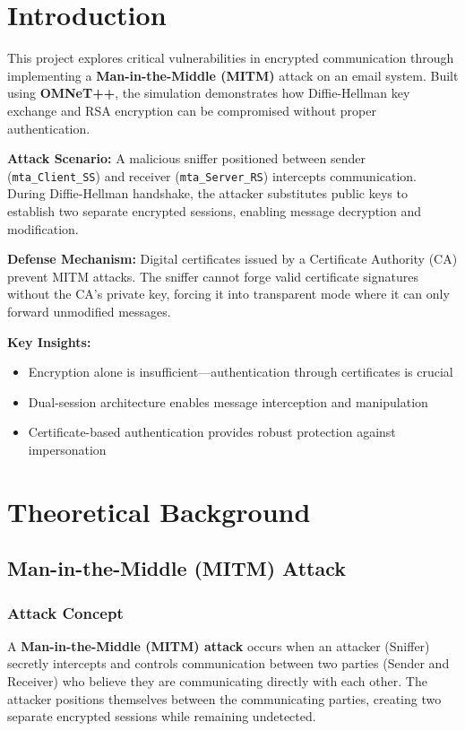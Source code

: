 \documentclass[a4paper,12pt]{extarticle}
\newcommand{\code}[1]{\texttt{\colorbox{codebackground}{#1}}}
\begin{document}
\section{Introduction}

This project explores critical vulnerabilities in encrypted communication through implementing a \textbf{Man-in-the-Middle (MITM)} attack on an email system. Built using \textbf{OMNeT++}, the simulation demonstrates how Diffie-Hellman key exchange and RSA encryption can be compromised without proper authentication.

\textbf{Attack Scenario:} A malicious sniffer positioned between sender (\code{mta\_Client\_SS}) and receiver (\code{mta\_Server\_RS}) intercepts communication. During Diffie-Hellman handshake, the attacker substitutes public keys to establish two separate encrypted sessions, enabling message decryption and modification.

\textbf{Defense Mechanism:} Digital certificates issued by a Certificate Authority (CA) prevent MITM attacks. The sniffer cannot forge valid certificate signatures without the CA's private key, forcing it into transparent mode where it can only forward unmodified messages.

\textbf{Key Insights:}
\begin{itemize}[label={\color{maincolor}$\star$}]
    \item Encryption alone is insufficient—authentication through certificates is crucial
    \item Dual-session architecture enables message interception and manipulation
    \item Certificate-based authentication provides robust protection against impersonation
\end{itemize}


\section{Theoretical Background}

\subsection{Man-in-the-Middle (MITM) Attack}

\subsubsection*{Attack Concept}

A \textbf{Man-in-the-Middle (MITM) attack} occurs when an attacker (Sniffer) secretly intercepts and controls communication between two parties (Sender and Receiver) who believe they are communicating directly with each other. The attacker positions themselves between the communicating parties, creating two separate encrypted sessions while remaining undetected.
\end{document}
